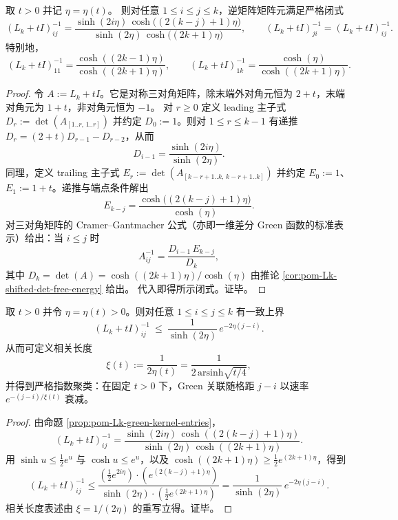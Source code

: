 \begin{proposition}\label{prop:pom-Lk-green-kernel-entries}
取 \(t>0\) 并记 \(\eta=\eta(t)\)。
则对任意 \(1\le i\le j\le k\)，逆矩阵矩阵元满足严格闭式
\[
(L_k+tI)^{-1}_{ij}
=\frac{\sinh(2i\eta)\,\cosh\!\bigl((2(k-j)+1)\eta\bigr)}
{\sinh(2\eta)\,\cosh\!\bigl((2k+1)\eta\bigr)},
\qquad
(L_k+tI)^{-1}_{ji}=(L_k+tI)^{-1}_{ij}.
\]
特别地，
\[
(L_k+tI)^{-1}_{11}=\frac{\cosh((2k-1)\eta)}{\cosh((2k+1)\eta)},
\qquad
(L_k+tI)^{-1}_{1k}=\frac{\cosh(\eta)}{\cosh((2k+1)\eta)}.
\]
\end{proposition}
\begin{proof}
令 \(A:=L_k+tI\)。它是对称三对角矩阵，除末端外对角元恒为 \(2+t\)，末端对角元为 \(1+t\)，非对角元恒为 \(-1\)。
对 \(r\ge 0\) 定义 leading 主子式
\(
D_r:=\det(A_{[1..r,\,1..r]})
\)
并约定 \(D_0:=1\)。则对 \(1\le r\le k-1\) 有递推 \(D_r=(2+t)D_{r-1}-D_{r-2}\)，从而
\[
D_{i-1}=\frac{\sinh(2i\eta)}{\sinh(2\eta)}.
\]
同理，定义 trailing 主子式
\(
E_r:=\det(A_{[k-r+1..k,\,k-r+1..k]})
\)
并约定 \(E_0:=1\)、\(E_1:=1+t\)。递推与端点条件解出
\[
E_{k-j}=\frac{\cosh\!\bigl((2(k-j)+1)\eta\bigr)}{\cosh(\eta)}.
\]
对三对角矩阵的 Cramer--Gantmacher 公式（亦即一维差分 Green 函数的标准表示）给出：当 \(i\le j\) 时
\[
A^{-1}_{ij}=\frac{D_{i-1}\,E_{k-j}}{D_k},
\]
其中 \(D_k=\det(A)=\cosh((2k+1)\eta)/\cosh(\eta)\) 由推论 \ref{cor:pom-Lk-shifted-det-free-energy} 给出。
代入即得所示闭式。证毕。
\end{proof}

\begin{corollary}\label{cor:pom-Lk-exponential-clustering-gaplaw}
取 \(t>0\) 并令 \(\eta=\eta(t)>0\)。则对任意 \(1\le i\le j\le k\) 有一致上界
\[
(L_k+tI)^{-1}_{ij}\ \le\ \frac{1}{\sinh(2\eta)}\,e^{-2\eta(j-i)}.
\]
从而可定义相关长度
\[
\xi(t):=\frac{1}{2\eta(t)}=\frac{1}{2\,\mathrm{arsinh}\sqrt{t/4}},
\]
并得到严格指数聚类：在固定 \(t>0\) 下，Green 关联随格距 \(j-i\) 以速率 \(e^{-(j-i)/\xi(t)}\) 衰减。
\end{corollary}
\begin{proof}
由命题 \ref{prop:pom-Lk-green-kernel-entries}，
\[
(L_k+tI)^{-1}_{ij}
=\frac{\sinh(2i\eta)\,\cosh((2(k-j)+1)\eta)}{\sinh(2\eta)\,\cosh((2k+1)\eta)}.
\]
用 \(\sinh u\le \tfrac12 e^{u}\) 与 \(\cosh u\le e^{u}\)，以及 \(\cosh((2k+1)\eta)\ge \tfrac12 e^{(2k+1)\eta}\)，得到
\[
(L_k+tI)^{-1}_{ij}
\le
\frac{(\tfrac12 e^{2i\eta})\cdot (e^{(2(k-j)+1)\eta})}{\sinh(2\eta)\cdot (\tfrac12 e^{(2k+1)\eta})}
=\frac{1}{\sinh(2\eta)}\,e^{-2\eta(j-i)}.
\]
相关长度表述由 \(\xi=1/(2\eta)\) 的重写立得。证毕。
\end{proof}

